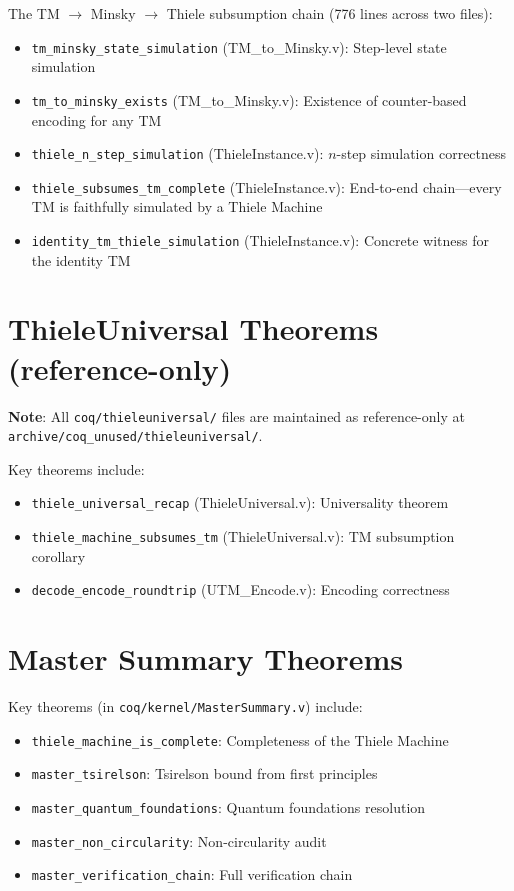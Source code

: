 The TM $\to$ Minsky $\to$ Thiele subsumption chain (776 lines across two files):
\begin{itemize}
    \item \texttt{tm\_minsky\_state\_simulation} (TM\_to\_Minsky.v): Step-level state simulation
    \item \texttt{tm\_to\_minsky\_exists} (TM\_to\_Minsky.v): Existence of counter-based encoding for any TM
    \item \texttt{thiele\_n\_step\_simulation} (ThieleInstance.v): $n$-step simulation correctness
    \item \texttt{thiele\_subsumes\_tm\_complete} (ThieleInstance.v): End-to-end chain---every TM is faithfully simulated by a Thiele Machine
    \item \texttt{identity\_tm\_thiele\_simulation} (ThieleInstance.v): Concrete witness for the identity TM
\end{itemize}

\section{ThieleUniversal Theorems (reference-only)}

\textbf{Note}: All \texttt{coq/thieleuniversal/} files are maintained as reference-only at \texttt{archive/coq\_unused/thieleuniversal/}.

Key theorems include:
\begin{itemize}
    \item \texttt{thiele\_universal\_recap} (ThieleUniversal.v): Universality theorem
    \item \texttt{thiele\_machine\_subsumes\_tm} (ThieleUniversal.v): TM subsumption corollary
    \item \texttt{decode\_encode\_roundtrip} (UTM\_Encode.v): Encoding correctness
\end{itemize}

\section{Master Summary Theorems}

Key theorems (in \texttt{coq/kernel/MasterSummary.v}) include:
\begin{itemize}
    \item \texttt{thiele\_machine\_is\_complete}: Completeness of the Thiele Machine
    \item \texttt{master\_tsirelson}: Tsirelson bound from first principles
    \item \texttt{master\_quantum\_foundations}: Quantum foundations resolution
    \item \texttt{master\_non\_circularity}: Non-circularity audit
    \item \texttt{master\_verification\_chain}: Full verification chain
\end{itemize}

